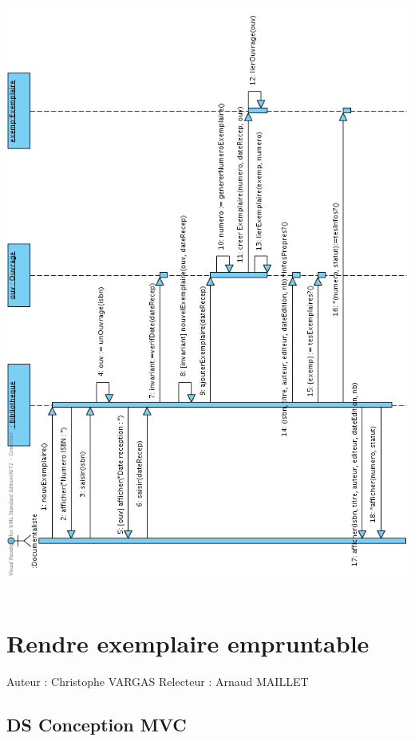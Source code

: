 \documentclass[a4paper,10pt]{report}
\begin{document}
\bigskip
\includegraphics[height=200mm]{NouvExempNormal.png}
\newpage


\section*{Rendre exemplaire empruntable}

Auteur : Christophe VARGAS
Relecteur : Arnaud MAILLET

\subsection*{DS Conception MVC}
\end{document}
